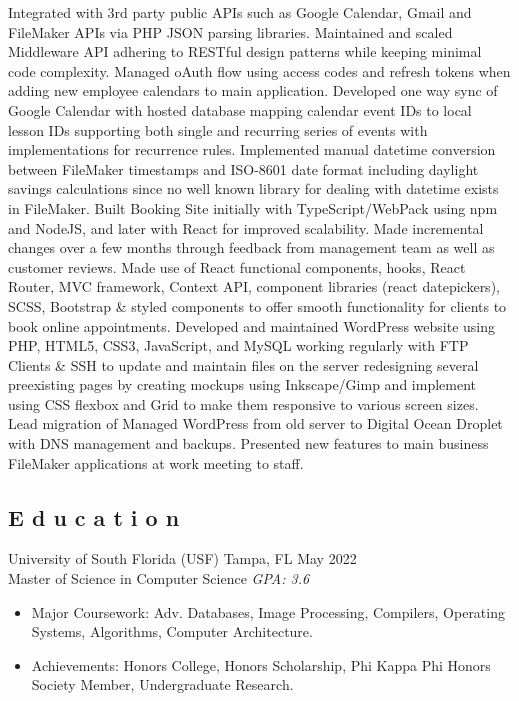 \documentclass{resume}
\begin{document}
\begin{itemize}
\li Integrated with 3rd party public APIs such as Google Calendar, Gmail and FileMaker APIs via PHP JSON parsing libraries.
\li Maintained and scaled Middleware API adhering to RESTful design patterns while keeping minimal code complexity.
\li Managed oAuth flow using access codes and refresh tokens when adding new employee calendars to main application.
\li Developed one way sync of Google Calendar with hosted database mapping calendar event IDs to local lesson IDs supporting both single and recurring series of events with implementations for recurrence rules.
\li Implemented manual datetime conversion between FileMaker timestamps and ISO-8601 date format including daylight savings calculations since no well known library for dealing with datetime exists in FileMaker.
\li Built Booking Site initially with TypeScript/WebPack using npm and NodeJS, and later with React for improved scalability.
\li Made incremental changes over a few months through feedback from management team as well as customer reviews.
\li Made use of React functional components, hooks, React Router, MVC framework, Context API, component libraries (react datepickers), SCSS, Bootstrap \& styled components to offer smooth functionality for clients to book online appointments.
\li Developed and maintained WordPress website using PHP, HTML5, CSS3, JavaScript, and MySQL working regularly with FTP Clients \& SSH to update and maintain files on the server redesigning several preexisting pages by creating mockups using Inkscape/Gimp and implement using CSS flexbox and Grid to make them responsive to various screen sizes.
\li Lead migration of Managed WordPress from old server to Digital Ocean Droplet with DNS management and backups.
\li Presented new features to main business FileMaker applications at work meeting to staff.
\end{itemize}


\subsection{E d u c a t i o n}
\schoolInfoLocationDate
  {University of South Florida (USF)}
  {Tampa, FL}
  {May 2022} \\
Master of Science in Computer Science \hfill \emph{GPA: 3.6}

\begin{itemize}
\item \small Major Coursework: Adv. Databases, Image Processing, Compilers, Operating Systems, Algorithms, Computer Architecture.
\item \small Achievements: Honors College, Honors Scholarship, Phi Kappa Phi Honors Society Member, Undergraduate Research.
\end{itemize}
\end{document}
